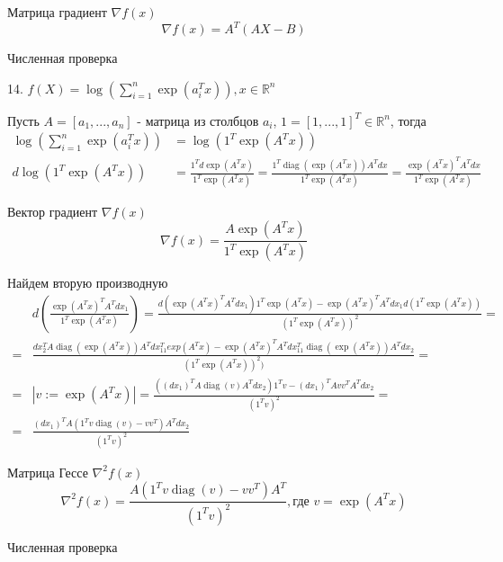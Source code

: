 \documentclass{article}
\DeclareMathOperator{\diag}{diag}
\newcommand{\RV}[1] {\mathbb{R}^{#1}}
\begin{document}
    Матрица градиент $\nabla f(x)$
    \begin{equation*}
         \nabla f(x) = A^T(AX - B)
    \end{equation*}
    
    Численная проверка
    
    \bigbreak
    
    14. $f(X) = \log(\sum_{i = 1}^{n} \exp(a_i^Tx)), x \in \RV{n}$
    \bigbreak
    
    Пусть $A = [a_1, ..., a_n]$ - матрица из столбцов $a_i$, $1 = [1, ..., 1]^T \in \RV{n}$, тогда
    \begin{align*}
        \log(\sum_{i = 1}^{n} \exp(a_i^Tx)) &= \log( 1^T\exp(A^Tx))\\
        d\log( 1^T\exp(A^Tx)) &= \frac{1^Td\exp(A^Tx)}{1^T\exp(A^Tx)} = 
        \frac{1^T\diag(\exp(A^Tx))A^Tdx}{1^T\exp(A^Tx)} =
        \frac{\exp(A^Tx)^TA^Tdx}{1^T\exp(A^Tx)}
    \end{align*}
    
    Вектор градиент $\nabla f(x)$
    \begin{equation*}
         \nabla f(x) = \frac{A\exp(A^Tx)}{1^T\exp(A^Tx)}
    \end{equation*}
    
    Найдем вторую производную
    \begin{align*}
        &d\left(\frac{\exp(A^Tx)^TA^Tdx_1}{1^T\exp(A^Tx)}\right) =
        \frac{d(\exp(A^Tx)^TA^Tdx_1)1^T\exp(A^Tx) - \exp(A^Tx)^TA^Tdx_1d(1^T\exp(A^Tx))}{(1^T\exp(A^Tx))^2} =\\
        = &\frac{dx_2^TA\diag(\exp(A^Tx))A^Tdx_11^Texp(A^Tx) -
        \exp(A^Tx)^TA^Tdx_11^T\diag(\exp(A^Tx))A^Tdx_2}{(1^T\exp(A^Tx))^2)} =\\
        = & | v := \exp(A^Tx) | = 
        \frac{((dx_1)^TA\diag(v)A^Tdx_2)1^Tv - (dx_1)^TAvv^TA^Tdx_2}{(1^Tv)^2} =\\
        = &\frac{ (dx_1)^TA(1^Tv\diag(v) - vv^T)A^Tdx_2}{(1^Tv)^2}
    \end{align*}
    
    Матрица Гессе $\nabla^2 f(x)$
    \begin{equation*}
         \nabla^2 f(x) = \frac{ A(1^Tv\diag(v) - vv^T)A^T}{(1^Tv)^2}, \text{где } v = \exp(A^Tx)
    \end{equation*}
    
    
    Численная проверка
    
    \bigbreak
    
\end{document}

